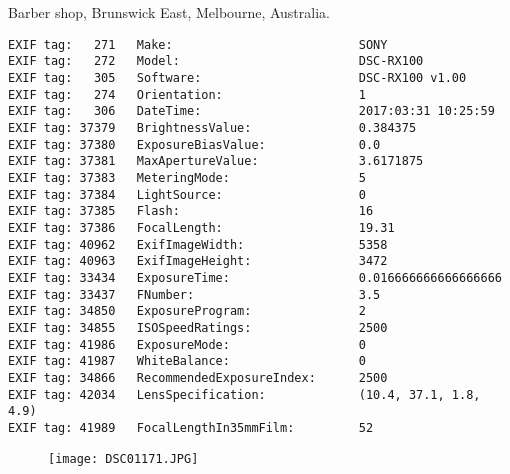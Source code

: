 \section{\protect{}}
\noindent Barber shop, Brunswick East, Melbourne, Australia.
\noindent
\begin{lstlisting}
EXIF tag:   271   Make:                          SONY
EXIF tag:   272   Model:                         DSC-RX100
EXIF tag:   305   Software:                      DSC-RX100 v1.00
EXIF tag:   274   Orientation:                   1
EXIF tag:   306   DateTime:                      2017:03:31 10:25:59
EXIF tag: 37379   BrightnessValue:               0.384375
EXIF tag: 37380   ExposureBiasValue:             0.0
EXIF tag: 37381   MaxApertureValue:              3.6171875
EXIF tag: 37383   MeteringMode:                  5
EXIF tag: 37384   LightSource:                   0
EXIF tag: 37385   Flash:                         16
EXIF tag: 37386   FocalLength:                   19.31
EXIF tag: 40962   ExifImageWidth:                5358
EXIF tag: 40963   ExifImageHeight:               3472
EXIF tag: 33434   ExposureTime:                  0.016666666666666666
EXIF tag: 33437   FNumber:                       3.5
EXIF tag: 34850   ExposureProgram:               2
EXIF tag: 34855   ISOSpeedRatings:               2500
EXIF tag: 41986   ExposureMode:                  0
EXIF tag: 41987   WhiteBalance:                  0
EXIF tag: 34866   RecommendedExposureIndex:      2500
EXIF tag: 42034   LensSpecification:             (10.4, 37.1, 1.8, 4.9)
EXIF tag: 41989   FocalLengthIn35mmFilm:         52

\end{lstlisting}
\clearpage
\begin{figure}
\raggedleft
\texttt{[image: DSC01171.JPG]}
\end{figure}


\clearpage
